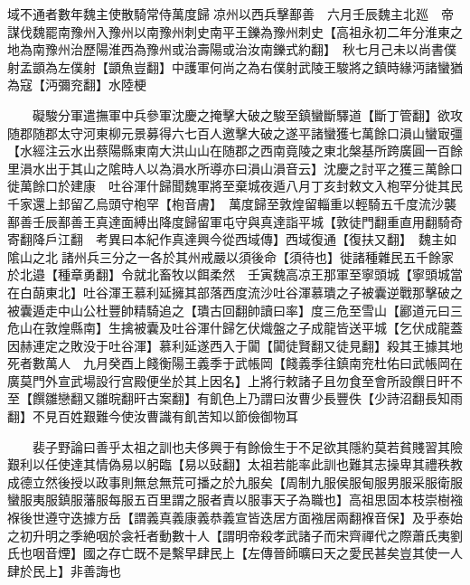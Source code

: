 域不通者數年魏主使散騎常侍萬度歸凉州以西兵擊鄯善　六月壬辰魏主北廵　帝謀伐魏罷南豫州入豫州以南豫州刺史南平王鑠為豫州刺史【高祖永初二年分淮東之地為南豫州治歷陽淮西為豫州或治壽陽或治汝南鑠式約翻】　秋七月己未以尚書僕射孟顗為左僕射【顗魚豈翻】中護軍何尚之為右僕射武陵王駿將之鎮時緣沔諸蠻猶為寇【沔彌兖翻】水陸梗

　　礙駿分軍遣撫軍中兵參軍沈慶之掩擊大破之駿至鎮蠻斷驛道【斷丁管翻】欲攻随郡随郡太守河東柳元景募得六七百人邀擊大破之遂平諸蠻獲七萬餘口溳山蠻㝡彊【水經注云水出蔡陽縣東南大洪山山在随郡之西南竟陵之東北槃基所跨廣圓一百餘里溳水出于其山之隂時人以為溳水所導亦曰溳山溳音云】沈慶之討平之獲三萬餘口徙萬餘口於建康　吐谷渾什歸聞魏軍將至棄城夜遁八月丁亥封敕文入枹罕分徙其民千家還上邽留乙烏頭守枹罕【枹音膚】　萬度歸至敦煌留輜重以輕騎五千度流沙襲鄯善壬辰鄯善王真達面縛出降度歸留軍屯守與真達詣平城【敦徒門翻重直用翻騎奇寄翻降戶江翻　考異曰本紀作真達興今從西域傳】西域復通【復扶又翻】　魏主如隂山之北諸州兵三分之一各於其州戒嚴以須後命【須待也】徙諸種雜民五千餘家於北邉【種章勇翻】令就北畜牧以餌柔然　壬寅魏高凉王那軍至寧頭城【寧頭城當在白蓢東北】吐谷渾王慕利延擁其部落西度流沙吐谷渾慕璝之子被囊逆戰那擊破之被囊遁走中山公杜豐帥精騎追之【璝古回翻帥讀曰率】度三危至雪山【酈道元曰三危山在敦煌縣南】生擒被囊及吐谷渾什歸乞伏熾盤之子成龍皆送平城【乞伏成龍蓋因赫連定之敗没于吐谷渾】慕利延遂西入于闐【闐徒賢翻又徒見翻】殺其王據其地死者數萬人　九月癸酉上餞衡陽王義季于武帳岡【餞義季往鎮南兖杜佑曰武帳岡在廣莫門外宣武場設行宫殿便坐於其上因名】上將行敕諸子且勿食至會所設饌日旰不至【饌雛戀翻又雛晥翻旰古案翻】有飢色上乃謂曰汝曹少長豐佚【少詩沼翻長知雨翻】不見百姓艱難今使汝曹識有飢苦知以節儉御物耳

　　裴子野論曰善乎太祖之訓也夫侈興于有餘儉生于不足欲其隱約莫若貧賤習其險艱利以任使達其情偽易以躬臨【易以䜴翻】太祖若能率此訓也難其志操卑其禮秩教成德立然後授以政事則無怠無荒可播之於九服矣【周制九服侯服甸服男服采服衛服蠻服夷服鎮服藩服每服五百里謂之服者責以服事天子為職也】高祖思固本枝崇樹襁褓後世遵守迭據方岳【謂義真義康義恭義宣皆迭居方面襁居兩翻褓音保】及乎泰始之初升明之季絶咽於衾衽者動數十人【謂明帝殺孝武諸子而宋齊禪代之際蕭氏夷劉氏也咽音煙】國之存亡既不是繫早肆民上【左傳晉師曠曰天之愛民甚矣豈其使一人肆於民上】非善誨也

